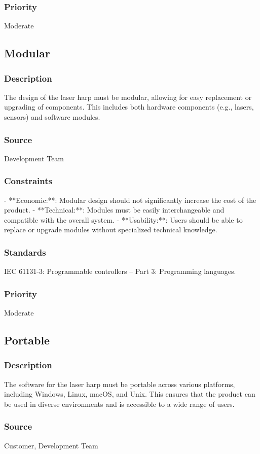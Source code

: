 \subsubsection{Priority}
Moderate


\subsection{Modular}
\subsubsection{Description}
The design of the laser harp must be modular, allowing for easy replacement or upgrading of components. This includes both hardware components (e.g., lasers, sensors) and software modules.
\subsubsection{Source}
Development Team
\subsubsection{Constraints}
- **Economic:**: Modular design should not significantly increase the cost of the product.
- **Technical:**: Modules must be easily interchangeable and compatible with the overall system.
- **Usability:**: Users should be able to replace or upgrade modules without specialized technical knowledge.
\subsubsection{Standards}
IEC 61131-3: Programmable controllers – Part 3: Programming languages.
\subsubsection{Priority}
Moderate


\subsection{Portable}
\subsubsection{Description}
The software for the laser harp must be portable across various platforms, including Windows, Linux, macOS, and Unix. This ensures that the product can be used in diverse environments and is accessible to a wide range of users.
\subsubsection{Source}
Customer, Development Team
